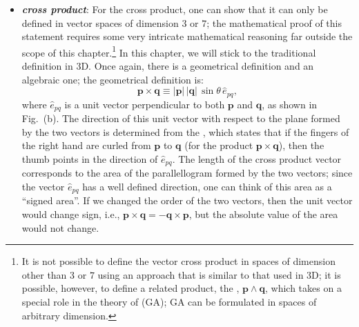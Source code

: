 \begin{itemize}
	\item \textbf{\textit{cross product}}: For the cross product, one can show that it can only be defined in vector spaces of dimension $3$ or $7$;  the mathematical proof of this statement requires some very intricate mathematical reasoning far outside the scope of this chapter.\footnote{It is not possible to define the vector cross product in spaces of dimension other than $3$ or $7$ using an approach that is similar to that used in 3D; it is possible, however, to define a related product, the , $\mathbf{p}\wedge\mathbf{q}$, which takes on a special role in the theory of  (GA); GA can be formulated in spaces of arbitrary dimension.}  In this chapter, we will stick to the traditional definition in 3D.  Once again, there is a geometrical definition and an algebraic one; the geometrical definition is:
	\begin{equation}
		\mathbf{p}\times\mathbf{q} \equiv \vert\mathbf{p}\vert\,\vert\mathbf{q}\vert\,\sin\theta\, \hat{e}_{pq},
	\end{equation}
	where $\hat{e}_{pq}$ is a unit vector perpendicular to both $\mathbf{p}$ and $\mathbf{q}$, as shown in Fig.~(b).  The direction of this unit vector with respect to the plane formed by the two vectors is determined from the , which states that if the fingers of the right hand are curled from $\mathbf{p}$ to $\mathbf{q}$ (for the product $\mathbf{p}\times\mathbf{q}$), then the thumb points in the direction of $\hat{e}_{pq}$. The length of the cross product vector corresponds to the area of the parallellogram formed by the two vectors; since the vector $\hat{e}_{pq}$ has a well defined direction, one can think of this area as a ``signed area''.  If we changed the order of the two vectors, then the unit vector would change sign, i.e., $\mathbf{p}\times\mathbf{q}=-\mathbf{q}\times\mathbf{p}$, but the absolute value of the area would not change.
	

\end{itemize}
